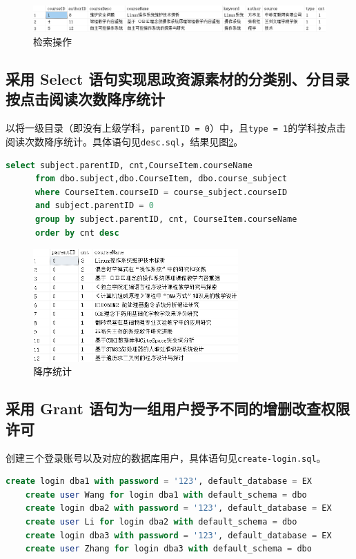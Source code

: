\documentclass[11pt]{article}
\begin{document}
  \begin{figure}[h]
    \centering
    \includegraphics[width=\textwidth]{select.png}
    \caption{检索操作}
    \label{fig:select}
  \end{figure}

  \subsection{采用 Select 语句实现思政资源素材的分类别、分目录按点击阅读次数降序统计}
  以将一级目录（即没有上级学科，\verb|parentID = 0|）中，且\verb|type = 1|的学科按点击阅读次数降序统计。具体语句见\verb|desc.sql|，结果见图\ref{fig:desc}。

  \begin{file}
    \begin{lstlisting}[language=sql]
      select subject.parentID, cnt,CourseItem.courseName 
      from dbo.subject,dbo.CourseItem, dbo.course_subject
      where CourseItem.courseID = course_subject.courseID 
      and subject.parentID = 0
      group by subject.parentID, cnt, CourseItem.courseName
      order by cnt desc
    \end{lstlisting}
  \end{file}

  \begin{figure}[h]
    \centering
    \includegraphics[width=0.7\textwidth]{desc.png}
    \caption{降序统计}
    \label{fig:desc}
  \end{figure}

  \subsection{采用 Grant 语句为一组用户授予不同的增删改查权限许可}
  创建三个登录账号以及对应的数据库用户，具体语句见\verb|create-login.sql|。
  \begin{file}
    \begin{lstlisting}[language=sql]
    create login dba1 with password = '123', default_database = EX
    create user Wang for login dba1 with default_schema = dbo
    create login dba2 with password = '123', default_database = EX
    create user Li for login dba2 with default_schema = dbo
    create login dba3 with password = '123', default_database = EX
    create user Zhang for login dba3 with default_schema = dbo
    \end{lstlisting}
  \end{file}
\end{document}
